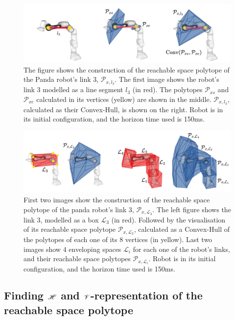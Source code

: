 \begin{figure}[!t]
    \centering
    \includegraphics[width=0.8\linewidth]{Papers/images/minkowski_line_nomath_withmath.png}
    \caption{ The figure shows the construction of the reachable space polytope of the Panda robot's link 3, $\mathcal{P}_{x,l_3}$. The first image shows the robot's link 3 modelled as a line segment $l_3$ (in red). The polytopes $\mathcal{P}_{xs}$ and $\mathcal{P}_{xe}$ calculated in its vertices (yellow) are shown in the middle. $\mathcal{P}_{x,l_3}$, calculated as their Convex-Hull, is shown on the right. Robot is in its initial configuration, and the horizon time used is 150ms.}
    \label{fig:minkowski_line}
\end{figure}

\begin{figure}[!t]
    \centering
    \includegraphics[width=\linewidth]{Papers/images/minkowski_block_nomath_withmath.jpg}
    \caption{ First two images show the construction of the reachable space polytope of the panda robot's link 3, $\mathcal{P}_{x,\mathcal{L}_3}$. The left figure shows the link 3, modelled as a box $\mathcal{L}_3$ (in red). Followed by the visualisation of its reachable space polytope $\mathcal{P}_{x,\mathcal{L}_3}$, calculated as a Convex-Hull of the polytopes of each one of its 8 vertices (in yellow).
    Last two images show 4 enveloping spaces $\mathcal{L}_i$ for each one of the robot's links, and their reachable space polytopes $\mathcal{P}_{x,\mathcal{L}_i}$. Robot is in its initial configuration, and the horizon time used is 150ms.}
    \label{fig:minkowski_block}
\end{figure}


\subsection{Finding $\mathscr{H}$ and $\mathscr{V}$-representation of the reachable space polytope}
\label{ch:enumerating}

